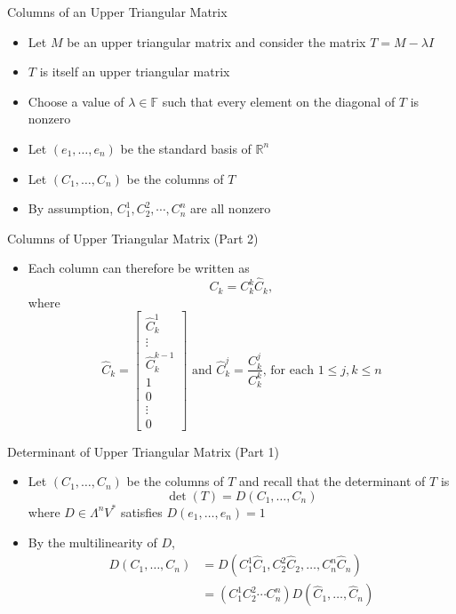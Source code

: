 \documentclass[usenames,dvipsnames,10pt]{beamer}
\newcommand\F{\mathbb{F}}
\newcommand{\R}{\mathbb{R}}
\begin{document}
\begin{frame}
  {Columns of an Upper Triangular Matrix}

  \begin{itemize}
  \item Let $M$ be an upper triangular matrix and consider the matrix $T = M - \lambda I$
  \item $T$ is itself an upper triangular matrix
  \item Choose a value of $\lambda \in \F$ such that every element on the diagonal of $T$ is nonzero
  \item Let $(e_1, \dots, e_n)$ be the standard basis of $\R^n$
  \item Let $(C_1, \dots, C_n)$ be the columns of $T$
  \item By assumption, $C^1_1, C^2_2, \cdots, C^n_n$ are all nonzero
  \end{itemize}
\end{frame}

\begin{frame}
  {Columns of Upper Triangular Matrix (Part 2)}

  \begin{itemize}
  \item Each column can therefore be written as
    \[
      C_k = C^k_k\hat{C}_k,
    \]
    where
    \[  \hat{C}_k = \begin{bmatrix} \hat{C}^1_k \\ \vdots \\ \hat{C}^{k-1}_k \\ 1 \\ 0 \\ \vdots \\ 0 \end{bmatrix}
      \text{ and }
      \hat{C}^j_k = \frac{C^j_k}{C^k_k}
      \text{, for each }1 \le j, k \le n \]
  \end{itemize}
\end{frame}

\begin{frame}
  {Determinant of Upper Triangular Matrix (Part 1)}

  \begin{itemize}
  \item Let $(C_1, \dots, C_n)$ be the columns of $T$ and recall that the determinant of $T$ is
    \[
      \det(T) = D(C_1, \dots, C_n)
    \]
    where $D \in \Lambda^nV^*$ satisfies $D(e_1, \dots, e_n) = 1$
  \item By the multilinearity of $D$,
    \begin{align*}
      D(C_1, \dots, C_n) &= D(C^1_1\hat{C}_1, C^2_2\hat{C}_2, \dots, C^n_n\hat{C}_n)\\
                         &= (C^1_1C^2_2\cdots C^n_n)D(\hat{C}_1, \dots, \hat{C}_n)
    \end{align*}
  \end{itemize}
\end{frame}
\end{document}
